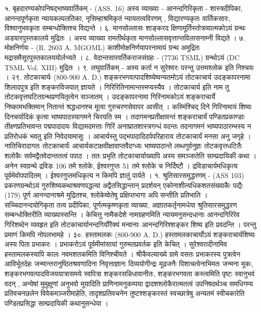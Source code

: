 ५. बृहदारण्यकोपनिषद्भाष्यवार्तिकम् - (ASS. 16)
अस्य व्याख्याः - आनन्दगिरिकृता - शास्त्रदीपिका, आनन्दपूर्णकृता न्यायकल्पलतिका, नृसिम्हाश्रमिकृतं न्यायतत्वविरणम् , विद्यारण्यकृतः वार्तिकसारः, विश्वानुभवकृता सम्बन्धोक्तिश्च विद्यन्ते ।
६. मानसोल्लासः
शाङ्करद क्षिणामूर्तिस्तोत्रव्यात्मकोऽयं ग्रन्थः अडयारपुस्तकालये मुद्रितः । अस्य व्याख्या रामतीर्थकृता मानसोल्लासवृत्तान्तविलासनाम्नी विद्यते ।
७. मोक्षनिर्णयः - (R. 2603 A. MGOML)
काशीमोक्षनिर्णयापरनामायं ग्रन्थ अमुद्रितः मद्रासमैसूरपुस्तकालययोर्लभ्यते ।
८. वेदान्तसारवर्तिकराजसंग्रहः - (7736 TSML) ग्रन्थोऽयं (DC TSML Vol. XIII) मुद्रितः ।
९. लघुवार्तिकम् - अस्य कर्ता न सुरेश्वरः परन्तु उत्तमश्लोक इति निश्चयः ।
२९. तोटकाचार्यः (800-900 A. D.)
शङ्करभगवत्पादशिष्येष्वन्यतमोऽयं तोटकाचार्य उदङ्कापरनामा शिलादपुत्र इति शङ्करविजयात् ज्ञायते । गिरिरितिनामान्तरमप्यस्यैव । तोटकाचार्य इति नाम तु तोटकवृत्तघटितग्रन्थप्रणयितृत्वेन सञ्जातम् ।
उदङ्कापरनामा गिरिनामकोऽयं शङ्कराचार्ये निष्कामभक्तिमान् नितान्तं श्रद्धधानश्च मूत्वा गुरुचरणसेवापर आसीत् । कस्मिंश्चिद् दिने गिरिनामायं शिष्यः दिनचर्यादिकं कृत्वा भाष्यपाठस्यागमने चिरयति स्म । तदागमनप्रतीक्षावन्तं शङ्कराचार्यं पण्डितप्रकाण्डाः तीक्ष्णप्रतिभावन्त पद्मपादादयः विद्यामदमत्ताः गिरिं अनाघ्रातशास्त्रगन्धं वदन्तः तदनागमनं भाष्यपाठारम्भस्य न प्रतिरोधकं भवतु इति निवेदयामासुः । आचार्यस्तु पद्भपादादिदर्पपरिहाराय तोटकाचार्यं मनसा अनु जगृहे । नातिचिरादागतः तोटकाचार्यंः आचार्यकटाक्षवीक्षावाप्तवैदग्ध्यः भाष्यपाठान्ते लब्धगुर्वनुज्ञः तोटकवृत्तधटितैः शलोकैः सर्वमद्वैतवेदान्ततत्वं पपाठ । ततः प्रभृति तोटकाचार्याख्यापि अस्य समञ्जातेति साम्प्रदायिकी कथा ।
अनेन स्वग्रन्थे द्रविडः 106 तमे श्लोके, ईश्वरगुप्तः 51 तमे श्लोके च निर्दिष्टौ । द्रविडाचार्यमधिकृत्य पूर्वमेवोपपादितम् । ईश्वरगुप्तमधिकृत्य न किमपि ज्ञातुं पार्यते ।
१. श्रुतिसारसमुद्धरणम् - (ASS 103)
प्रकरणग्रन्थोऽयं गुरुशिष्यकथाश्रवणपद्धत्या अद्वैतसिद्धान्तान् प्रदर्शयन् एकोनाशीत्यधिकशतसंख्याकैः पद्यैः (179) पूर्ण आनन्दानाश्रमे मुद्रितश्च, श्लोकेष्वेतेषु प्रक्षिप्तभागा अपि सन्तीति प्रतिभाति । सच्चिदानन्दयोगिकृता तत्व प्रदीपिका, पूर्णत्मकृष्णकृता व्याख्या, अज्ञातकर्तृनामधेया श्रुतिसारसमुद्धरण सम्बन्धोक्तिरीति व्याख्यास्सन्ति ।
केचित्तु नामैकदेशे नामग्रहणमिति न्यायमनुसन्दधानाः आनन्दगिरिरेव गिरिशब्देन व्यवहृत इति तोटकाचार्यानन्दगिर्योरैक्यं मन्वानाः आनन्दगिरिश्शङ्कर शिष्य इति प्रवदन्ति । परन्तु प्रमाणं किमपि नोपलभामहे ।
३०. हस्तामलकः (800-900 A. D.)
हस्तामलकाचार्योऽयं शङ्कराचार्यशिष्यः अस्य पिता प्रभाकरः । प्रभाकरोऽयं पूर्वमीमांसायां गुरुमतप्रवर्तक इति केचित् । सुरेश्वरादीनामिव हस्तामलकस्यापि कालः नवमशतकमिति विनिश्चीयते ।
श्रीकैवल्याख्ये ग्रामे वसतः प्रभाकरस्य पुत्रत्वेन आविर्भूतदेहः जन्मान्तरानुष्ठितश्रवणादिना निवृत्ताज्ञानः दिव्ययोगीन्द्रः मूढजनैः पिशाचत्वेनाभिमतः जन्मना मूकः, शङ्करभगवत्पादविजययात्रासमये स्वपित्रा शङ्करसन्निधावानीतः, शङ्करभगवता कस्त्वमिति पृष्टः स्वानुभवं वदन् , अन्येषां मुमुक्षूणां अनुभवो मूयादिति प्राणिनामनुकम्पया द्वादशश्लोकैरात्मतत्वं उपनिषदर्थञ्च समधिगम्य प्रतिवचनछलेन विवेकमञ्जरीमाहेति, तादृशप्रतिवचनेन तुष्टश्शङ्करस्तं स्वच्छात्रेषु अन्यतमं स्वीचकारेति पण्डितप्रसिद्धा साम्प्रदायिकी कथानुसन्धेया ।

